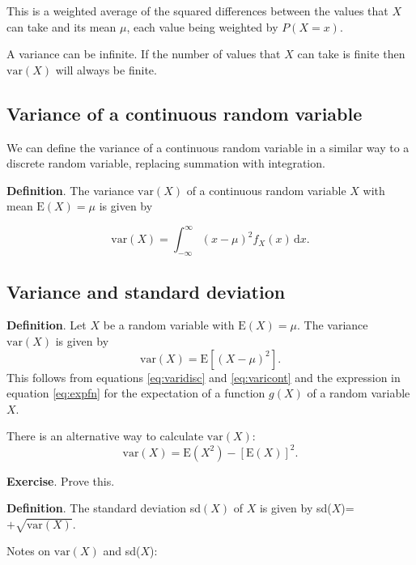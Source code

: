 \documentclass[
  british,
  11pt,
  openany, a4paper]{book}
\begin{document}
This is a weighted average of the squared differences between the values that \(X\) can take and its mean \(\mu\), each value being weighted by \(P(X=x)\).

A variance can be infinite. If the number of values that \(X\) can take is finite then \(\mathrm{var}(X)\) will always be finite.

\subsection{Variance of a continuous random variable}\label{variance-of-a-continuous-random-variable}

We can define the variance of a continuous random variable in a similar way to a discrete random variable, replacing summation with integration.

\textbf{Definition}. The variance \(\mathrm{var}(X)\) of a continuous random variable \(X\) with mean \(\mathrm{E}(X)=\mu\) is given by

\begin{equation}
\mathrm{var}(X) = \int_{-\infty}^{\infty} (x-\mu)^2 f_X(x) \,\mathrm{d}x. 
\label{eq:varicont}
\end{equation}

\subsection{Variance and standard deviation}\label{variance-and-standard-deviation}

\textbf{Definition}. Let \(X\) be a random variable with \(\mathrm{E}(X)=\mu\). The variance \(\mathrm{var}(X)\) is given by
\[ \mathrm{var}(X) = \mathrm{E}\left[(X-\mu)^2\right]. \]
This follows from equations \eqref{eq:varidisc} and \eqref{eq:varicont} and the expression in equation \eqref{eq:expfn} for the expectation of a function \(g(X)\) of a random variable \(X\).

There is an alternative way to calculate \(\mathrm{var}(X)\):
\[ \mathrm{var}(X) = \mathrm{E}\left(X^2\right) - [\mathrm{E}(X)]^2. \]

\textbf{Exercise}. Prove this.

\textbf{Definition}. The standard deviation sd\((X)\) of \(X\) is given by sd(\(X\))=\(+\sqrt{\mathrm{var}(X)}\).

Notes on \(\mathrm{var}(X)\) and sd(\(X\)):
\end{document}
